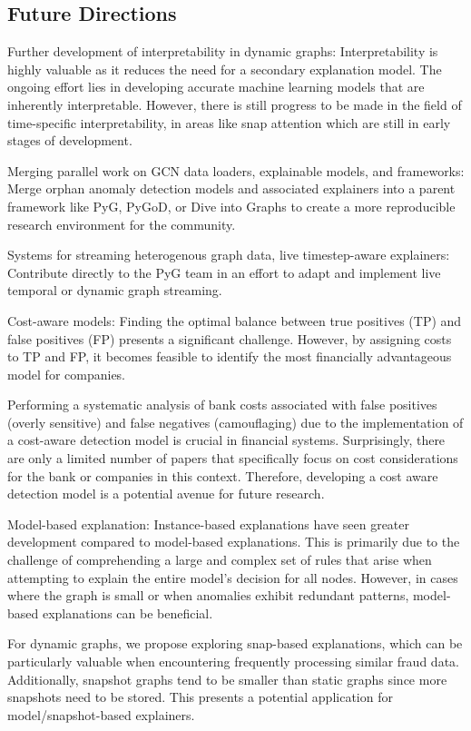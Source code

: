 \subsection{Future Directions}
Further development of interpretability in dynamic graphs: Interpretability is highly valuable as it reduces the need for a secondary explanation model. The ongoing effort lies in developing accurate machine learning models that are inherently interpretable. However, there is still progress to be made in the field of time-specific interpretability, in areas like snap attention which are still in early stages of development.

Merging parallel work on GCN data loaders, explainable models, and frameworks: Merge orphan anomaly detection models and associated explainers into a parent framework like PyG, PyGoD, or Dive into Graphs to create a more reproducible research environment for the community.

Systems for streaming heterogenous graph data, live timestep-aware explainers: Contribute directly to the PyG team in an effort to adapt and implement live temporal or dynamic graph streaming.

Cost-aware models: Finding the optimal balance between true positives (TP) and false positives (FP) presents a significant challenge. However, by assigning costs to TP and FP, it becomes feasible to identify the most financially advantageous model for companies.

Performing a systematic analysis of bank costs associated with false positives (overly sensitive) and false negatives (camouflaging) due to the implementation of a cost-aware detection model is crucial in financial systems. Surprisingly, there are only a limited number of papers that specifically focus on cost considerations for the bank or companies in this context. Therefore, developing a cost aware detection model is a potential avenue for future research.

Model-based explanation: Instance-based explanations have seen greater development compared to model-based explanations. This is primarily due to the challenge of comprehending a large and complex set of rules that arise when attempting to explain the entire model's decision for all nodes. However, in cases where the graph is small or when anomalies exhibit redundant patterns, model-based explanations can be beneficial.

For dynamic graphs, we propose exploring snap-based explanations, which can be particularly valuable when encountering frequently processing similar fraud data. Additionally, snapshot graphs tend to be smaller than static graphs since more snapshots need to be stored. This presents a potential application for model/snapshot-based explainers.